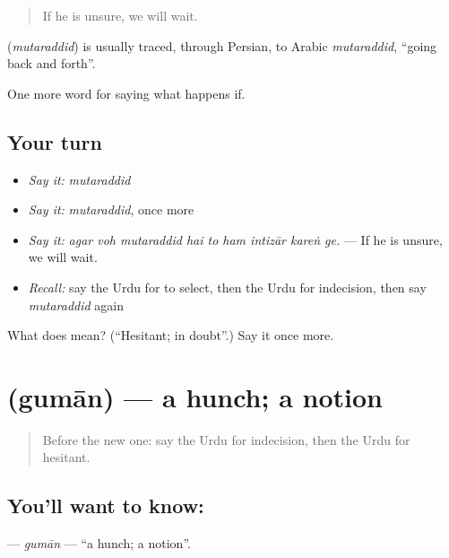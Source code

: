 \begin{quote}
If he is unsure, we will wait.
\end{quote}

\begin{cousinweb}
\textbf{} (\emph{mutaraddid}) is usually traced, through Persian, to Arabic \emph{mutaraddid}, \textquotedblleft{}going back and forth\textquotedblright{}.
\end{cousinweb}

\begin{grammarlens}[title={What you've built}]
One more word for saying what happens if.
\end{grammarlens}

\subsection*{Your turn}
\begin{itemize}
\raggedright
  \item \emph{Say it:} \emph{mutaraddid}
  \item \emph{Say it:} \emph{mutaraddid}, once more
  \item \emph{Say it:} \emph{agar voh mutaraddid hai to ham intizār kareṅ ge.} — If he is unsure, we will wait.
  \item \emph{Recall:} say the Urdu for to select, then the Urdu for indecision, then say \emph{mutaraddid} again
\end{itemize}

\begin{tcolorbox}[breakable,colback=teal!4,colframe=teal!35!black,title={Before you move on}]
What does  mean? (\textquotedblleft{}Hesitant; in doubt\textquotedblright{}.) Say it once more.
\end{tcolorbox}
\section[\texorpdfstring{\ur{گمان} (gumān)}{گمان (gumān)}]{ (gumān) — a hunch; a notion}

\label{lesson:UR-C538-guman}



\begin{quote}
Before the new one: say the Urdu for indecision, then the Urdu for hesitant.
\end{quote}

\subsection*{You'll want to know: }
\textbf{} — \emph{gumān} — \textquotedblleft{}a hunch; a notion\textquotedblright{}.

